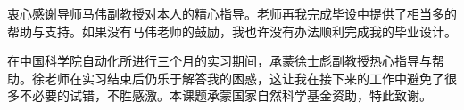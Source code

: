 \begin{acknowledgement}
  衷心感谢导师马伟副教授对本人的精心指导。老师再我完成毕设中提供了相当多的帮助与支持。如果没有马伟老师的鼓励，我也许没有办法顺利完成我的毕业设计。

  在中国科学院自动化所进行三个月的实习期间，承蒙徐士彪副教授热心指导与帮助。徐老师在实习结束后仍乐于解答我的困惑，这让我在接下来的工作中避免了很多不必要的试错，不胜感激。本课题承蒙国家自然科学基金资助，特此致谢。

  
\end{acknowledgement}
